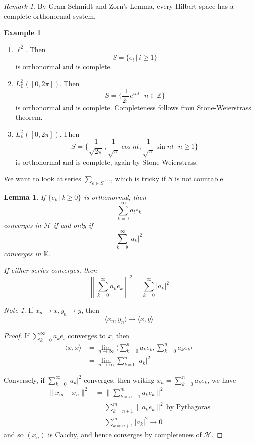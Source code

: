 \documentclass[10pt, oneside, reqno]{amsbook}
\theoremstyle{plain}%
\newtheorem{lem}[thm]{Lemma}
\theoremstyle{definition}
\newtheorem{exmp}[thm]{Example}
\theoremstyle{remark}
\newtheorem*{rem}{Remark}
\newtheorem*{note}{Note}
\newcommand{\R}{\mathbb{R}}
\newcommand{\K}{\mathbb{K}}
\newcommand{\Hil}{\mathcal{H}}
\newcommand{\Com}{\mathbb{C}}
\newcommand{\Z}{\mathbb{Z}}
\begin{document}
\begin{rem}
    By Gram-Schmidt and Zorn's Lemma, every Hilbert space has a complete orthonormal system.   
\end{rem}

\begin{exmp}
    \begin{enumerate}
        \item $\ell^2$.  Then \[
            S = \{ e_i \, | \, i \geq 1 \}
        \] is orthonormal and is complete.  
        \item $L^2_\Com([0, 2 \pi])$.  Then \[
            S = \{ \frac{1}{2\pi} e^{i n t} \, | \, n \in \Z \}
        \] is orthonormal and is complete.  Completeness follows from Stone-Weierstrass theorem.
        \item $L^2_\R([0, 2 \pi])$.  Then \[
            S= \{ \frac{1}{\sqrt{2\pi}}, \frac{1}{\sqrt{\pi}} \cos nt, \frac{1}{\sqrt{\pi}} \sin nt \, | \, n \geq 1 \}
        \] is orthonormal and is complete, again by Stone-Weierstrass.  
    \end{enumerate}
\end{exmp}

    We want to look at series $\sum_{e \in S} ...$, which is tricky if $S$ is not countable.

\begin{lem}\label{lem:tod}
    If $\{ e_k \, | \, k \geq 0 \}$ is orthonormal, then \[
        \sum_{k=0}^\infty a_l e_k
    \] converges in $\Hil$ if and only if \[
        \sum_{k=0}^\infty |a_k |^2
    \] converges in $\K$.  
    
    If either series converges, then \[
        \left\| \sum_{k=0}^\infty a_k e_k \right\|^2 = \sum_{k=0}^\infty | a_k |^2
    \]
\end{lem}

\begin{note}
    If $x_n \rightarrow x,y_n \rightarrow y$, then \[
        \langle x_n, y_n \rangle \rightarrow \langle x, y \rangle
    \]
\end{note}


\begin{proof}
    If $\sum_{k=0}^\infty a_k e_k$ converges to $x$, then \begin{align*}
        \langle x, x \rangle &= \lim_{n \rightarrow \infty} \langle \sum_{k=0}^n a_k e_k, \sum_{k=0}^n a_k e_k \rangle \\
        &= \lim_{n \rightarrow \infty} \sum_{k=0}^n | a_k |^2
    \end{align*}
    
    Conversely, if $\sum_{k=0}^\infty |a_k |^2$ converges, then writing $x_n = \sum_{k=0}^n a_k e_k$, we have \begin{align*}
        \| x_m - x_n \|^2 &= \| \sum_{k=n+1}^m a_k e_k \|^2 \\
                        &= \sum_{k=n+1}^m \| a_k e_k \|^2 \, \text{by Pythagoras} \\
                        &= \sum_{k=n+1}^m |a_k |^2 \rightarrow 0
    \end{align*} and so $(x_n)$ is Cauchy, and hence converges by completeness of $\Hil$.  
\end{proof}
\end{document}
